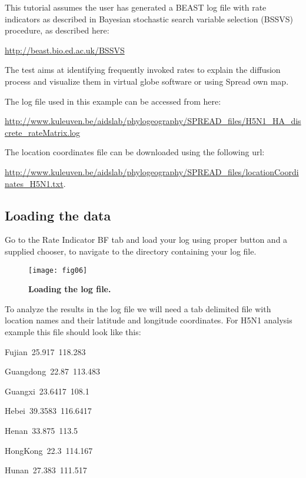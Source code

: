 This tutorial assumes the user has generated a BEAST log file with
rate indicators as described in Bayesian stochastic search variable
selection (BSSVS) procedure, as described here:

\url{http://beast.bio.ed.ac.uk/BSSVS} 

\noindent
The test aims at identifying frequently invoked rates to explain the
diffusion process and visualize them in virtual globe software or
using Spread own map. 

\noindent
The log file used in this example can be accessed from here:

\url{http://www.kuleuven.be/aidslab/phylogeography/SPREAD_files/H5N1_HA_discrete_rateMatrix.log}

\noindent
The location coordinates file can be downloaded using the following
url: 

\url{http://www.kuleuven.be/aidslab/phylogeography/SPREAD_files/locationCoordinates_H5N1.txt}.


\subsection{Loading the data}

Go to the Rate Indicator BF tab and load your log using proper button
and a supplied chooser, to navigate to the directory containing your
log file. 

\begin{figure}[h!]
\begin{centering}
\texttt{[image: fig06]}
\caption{
{ \footnotesize 
{\bf Loading the log file.}
} %
}
\label{fig:06}
\par\end{centering}
\end{figure}

To analyze the results in the log file we will need a tab delimited
file with location names and their latitude and longitude coordinates.
For H5N1 analysis example this file should look like this:

\begin{lyxcode}
Fujian~25.917~118.283

Guangdong~22.87~113.483

Guangxi~23.6417~108.1

Hebei~39.3583~116.6417

Henan~33.875~113.5

HongKong~22.3~114.167

Hunan~27.383~111.517
\end{lyxcode}

